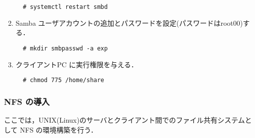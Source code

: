 \documentclass[a4j,titlepage]{jarticle}
\begin{document}
\begin{enumerate}
  \begin{center}
    \begin{screen}
\begin{verbatim}
  # systemctl restart smbd
\end{verbatim}
    \end{screen}
    \end{center}

    \item Samba ユーザアカウントの追加とパスワードを設定(パスワードはroot00)する．

  \begin{center}
    \begin{screen}
\begin{verbatim}
  # mkdir smbpasswd -a exp
\end{verbatim}
    \end{screen}
    \end{center}

    \item クライアントPC に実行権限を与える．

  \begin{center}
    \begin{screen}
\begin{verbatim}
  # chmod 775 /home/share
\end{verbatim}
    \end{screen}
    \end{center}

\end{enumerate}

    \subsubsection{NFS の導入}
    ここでは，UNIX(Linux)のサーバとクライアント間でのファイル共有システムとして NFS の環境構築を行う．
\end{document}
